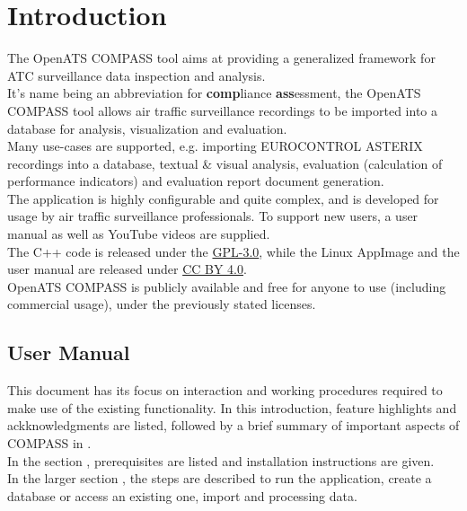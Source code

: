 \chapter{Introduction}

The OpenATS COMPASS tool aims at providing a generalized framework for ATC surveillance data inspection and analysis. \\

It’s name being an abbreviation for \textbf{comp}liance \textbf{ass}essment, the OpenATS COMPASS tool allows air traffic surveillance recordings to be imported into a database for analysis, visualization and evaluation. \\

Many use-cases are supported, e.g. importing EUROCONTROL ASTERIX recordings into a database, textual \& visual analysis, evaluation (calculation of performance indicators) and evaluation report document generation. \\

The application is highly configurable and quite complex, and is developed for usage by air traffic surveillance professionals. To support new users, a user manual as well as YouTube videos are supplied. \\

The C++ code is released under the \href{https://www.gnu.org/licenses/gpl-3.0.en.html}{GPL-3.0}, while the Linux AppImage and the user manual are released under \href{https://creativecommons.org/licenses/by/4.0/}{CC BY 4.0}. \\

OpenATS COMPASS is publicly available and free for anyone to use (including commercial usage), under the previously stated licenses.

\section{User Manual}

This document has its focus on interaction and working procedures required to make use of the existing
functionality. In this introduction, feature highlights and ackknowledgments are listed, followed by a brief summary of important aspects of  COMPASS in . \\

In the section , prerequisites are listed and installation instructions are given. \\

In the larger section , the steps are described to run the application, create a database or access an existing one, import and processing data. \\

